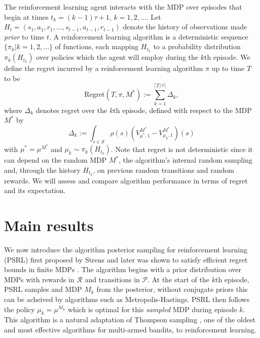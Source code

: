 \documentclass{article}
\newcommand{\Pc}{\mathcal{P}}
\newcommand{\Rc}{\mathcal{R}}
\newcommand{\Sc}{\mathcal{S}}
\begin{document}
The reinforcement learning agent interacts with the MDP over episodes that begin at times $t_k = (k-1) \tau + 1$, $k=1,2,\ldots$.
Let $H_t = (s_1,a_1,r_1,\ldots,s_{t-1},a_{t-1},r_{t-1})$ denote the history of observations made \emph{prior} to time $t$.
A reinforcement learning algorithm is a deterministic sequence $\{\pi_k | k = 1, 2, \ldots\}$ of functions, each mapping $H_{t_k}$ to a probability distribution $\pi_{k}(H_{t_k})$ over policies which the agent will employ during the $k$th episode.
We define the regret incurred by a reinforcement learning algorithm $\pi$ up to time $T$ to be
$$\text{Regret}(T, \pi, M^*) := \sum_{k=1}^{\lceil T/\tau \rceil} \Delta_k,$$
where $\Delta_k$ denotes regret over the $k$th episode, defined with respect to the MDP $M^*$ by
$$\Delta_k := \int_{s \in \Sc} \rho(s) \left(V^{M^*}_{\mu^*, 1} - V^{M^{*}}_{\mu_k, 1}\right)(s) $$
with $\mu^* = \mu^{M^*}$ and $\mu_{k}\sim \pi_{k}(H_{t_k})$. Note that regret is not deterministic since it can depend on the random MDP $M^*$, the algorithm's internal random sampling and, through the history $H_{t_k}$, on previous random transitions and random rewards. We will assess and compare algorithm performance in terms of regret and its expectation.



\section{Main results}
We now introduce the algorithm posterior sampling for reinforcement learning (PSRL) first proposed by Strens \cite{strens2000bayesian} and later was shown to satisfy efficient regret bounds in finite MDPs \cite{osband2013more}.
The algorithm begins with a prior distribution over MDPs with rewards in $\Rc$ and transitions in $\Pc$.
At the start of the $k$th episode, PSRL samples and MDP $M_k$ from the posterior, without conjugate priors this can be acheived by algorithms such as Metropolis-Hastings.
PSRL then follows the policy $\mu_k = \mu^{M_k}$ which is optimal for this \emph{sampled} MDP during episode $k$.
This algorithm is a natural adaptation of Thompson sampling \cite{thompson1933}, one of the oldest and most effective algorithms for multi-armed bandits, to reinforcement learning.
\end{document}
